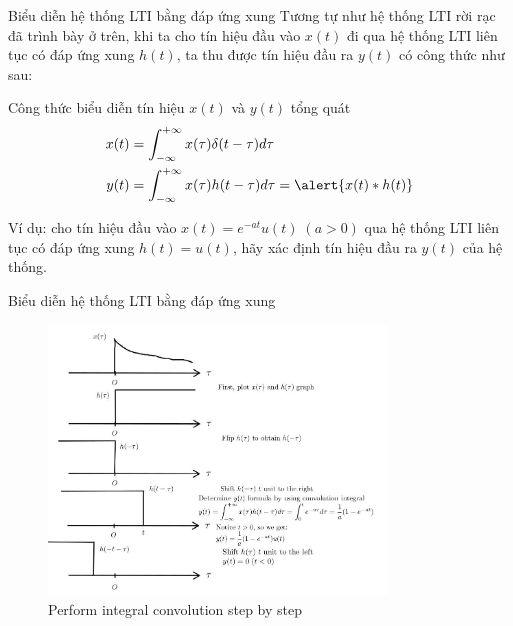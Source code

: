 \documentclass[8pt]{beamer}
\begin{document}
\begin{frame}{Biểu diễn hệ thống LTI bằng đáp ứng xung}
Tương tự như hệ thống LTI rời rạc đã trình bày ở trên, khi ta cho tín hiệu đầu vào $x(t)$ đi qua hệ thống LTI liên tục có đáp ứng xung $h(t)$, ta thu được tín hiệu đầu ra $y(t)$ có công thức như sau:
\begin{block}{Công thức biểu diễn tín hiệu $x(t)$ và $y(t)$ tổng quát}
	\begin{equation*}
	\begin{split}
		x(t)&=\int_{-\infty}^{+\infty}x(\tau)\delta(t-\tau)d\tau\\
		y(t)&=\int_{-\infty}^{+\infty}x(\tau)h(t-\tau)d\tau=\alert{x(t)*h(t)}\\
	\end{split}
	\end{equation*}
\end{block}
Ví dụ: cho tín hiệu đầu vào $x(t)=e^{-at}u(t)\; (a>0)$ qua hệ thống LTI liên tục có đáp ứng xung $h(t)=u(t)$, hãy xác định tín hiệu đầu ra $y(t)$ của hệ thống.
\end{frame}
\begin{frame}{Biểu diễn hệ thống LTI bằng đáp ứng xung}

\begin{figure}[h]
			\includegraphics[width=0.8\textwidth]{conv1.jpg}
			\caption{Perform integral convolution step by step}\label{fig:re7}
		\end{figure}
\end{frame}
\end{document}
